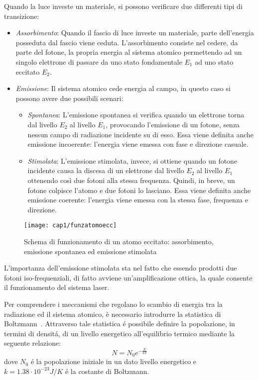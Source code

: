 Quando la luce investe un materiale, si possono verificare due differenti tipi di transizione:
\begin{itemize}
	\item \emph{Assorbimento}: Quando il fascio di luce investe un materiale, parte dell'energia posseduta dal fascio viene ceduta. L'assorbimento consiste nel cedere, da parte del fotone, la propria energia al sistema atomico permettendo ad un singolo elettrone di passare da uno stato fondamentale $E_{1}$ ad uno stato eccitato $E_{2}$.
	\item \emph{Emissione}: Il sistema atomico cede energia al campo, in questo caso si possono avere due possibili scenari:
	\begin{itemize}
		\item \emph{Spontanea}: L'emissione spontanea si verifica quando un elettrone torna dal livello $E_{2}$ al livello $E_{1}$, provocando l'emissione di un fotone, senza nessun campo di radiazione incidente su di esso. Essa viene definita anche emissione incoerente: l'energia viene emessa con fase e direzione casuale.
		\item \emph{Stimolata}: L'emissione stimolata, invece, si ottiene quando un fotone incidente causa la discesa di un elettrone dal livello $E_{2}$ al livello $E_{1}$ ottenendo così due fotoni alla stessa frequenza. Quindi, in breve, un fotone colpisce l'atomo e due fotoni lo lasciano. Essa viene definita anche emissione coerente: l'energia viene emessa con la stessa fase, frequenza e direzione.
	\end{itemize} 
\end{itemize}
\begin{figure}[H]
  \begin{center}
    \texttt{[image: cap1/funzatomoecc]}
    \caption{Schema di funzionamento di un atomo eccitato: assorbimento, emissione spontanea ed emissione stimolata}
    \label{funzatomoecc}
  \end{center}
\end{figure}
L'importanza dell'emissione stimolata sta nel fatto che essendo prodotti due fotoni iso-frequenziali, di fatto avviene un'amplificazione ottica, la quale consente il funzionamento del sistema laser.

Per comprendere i meccanismi che regolano lo scambio di energia tra la radiazione ed il sistema atomico, è necessario introdurre la statistica di Boltzmann~\cite{kasap2012optoelectronics}. Attraverso tale statistica \'e possibile definire la popolazione, in termini di densit\'a, di un livello energetico all'equilibrio termico mediante la seguente relazione:
\begin{equation}
  N=N_0e^{{-\frac{E}{kT}}}
\end{equation}
dove $N_0$ \'e la popolazione iniziale in un dato livello energetico e $k= 1.38 \cdot 10^{-23} J / K$ \'e la costante di Boltzmann.
 
